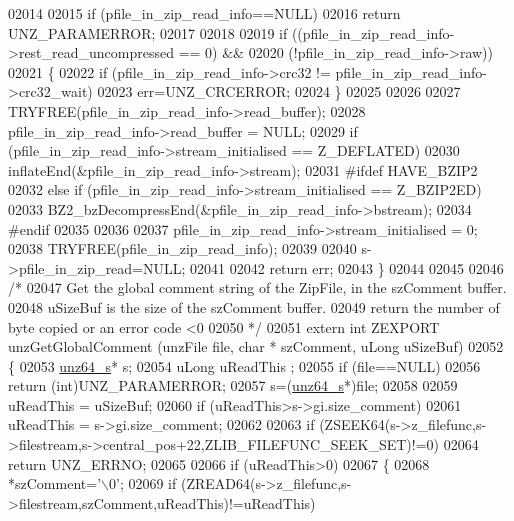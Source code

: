 \begin{DoxyCode}
02014 
02015     \textcolor{keywordflow}{if} (pfile\_in\_zip\_read\_info==NULL)
02016         \textcolor{keywordflow}{return} UNZ\_PARAMERROR;
02017 
02018 
02019     \textcolor{keywordflow}{if} ((pfile\_in\_zip\_read\_info->rest\_read\_uncompressed == 0) &&
02020         (!pfile\_in\_zip\_read\_info->raw))
02021     \{
02022         \textcolor{keywordflow}{if} (pfile\_in\_zip\_read\_info->crc32 != pfile\_in\_zip\_read\_info->crc32\_wait)
02023             err=UNZ\_CRCERROR;
02024     \}
02025 
02026 
02027     TRYFREE(pfile\_in\_zip\_read\_info->read\_buffer);
02028     pfile\_in\_zip\_read\_info->read\_buffer = NULL;
02029     \textcolor{keywordflow}{if} (pfile\_in\_zip\_read\_info->stream\_initialised == Z\_DEFLATED)
02030         inflateEnd(&pfile\_in\_zip\_read\_info->stream);
02031 \textcolor{preprocessor}{#ifdef HAVE\_BZIP2}
02032     \textcolor{keywordflow}{else} \textcolor{keywordflow}{if} (pfile\_in\_zip\_read\_info->stream\_initialised == Z\_BZIP2ED)
02033         BZ2\_bzDecompressEnd(&pfile\_in\_zip\_read\_info->bstream);
02034 \textcolor{preprocessor}{#endif}
02035 
02036 
02037     pfile\_in\_zip\_read\_info->stream\_initialised = 0;
02038     TRYFREE(pfile\_in\_zip\_read\_info);
02039 
02040     s->pfile\_in\_zip\_read=NULL;
02041 
02042     \textcolor{keywordflow}{return} err;
02043 \}
02044 
02045 
02046 \textcolor{comment}{/*}
02047 \textcolor{comment}{  Get the global comment string of the ZipFile, in the szComment buffer.}
02048 \textcolor{comment}{  uSizeBuf is the size of the szComment buffer.}
02049 \textcolor{comment}{  return the number of byte copied or an error code <0}
02050 \textcolor{comment}{*/}
02051 \textcolor{keyword}{extern} \textcolor{keywordtype}{int} ZEXPORT unzGetGlobalComment (unzFile file, \textcolor{keywordtype}{char} * szComment, uLong uSizeBuf)
02052 \{
02053     \hyperlink{structunz64__s}{unz64\_s}* s;
02054     uLong uReadThis ;
02055     \textcolor{keywordflow}{if} (file==NULL)
02056         \textcolor{keywordflow}{return} (\textcolor{keywordtype}{int})UNZ\_PARAMERROR;
02057     s=(\hyperlink{structunz64__s}{unz64\_s}*)file;
02058 
02059     uReadThis = uSizeBuf;
02060     \textcolor{keywordflow}{if} (uReadThis>s->gi.size\_comment)
02061         uReadThis = s->gi.size\_comment;
02062 
02063     \textcolor{keywordflow}{if} (ZSEEK64(s->z\_filefunc,s->filestream,s->central\_pos+22,ZLIB\_FILEFUNC\_SEEK\_SET)!=0)
02064         \textcolor{keywordflow}{return} UNZ\_ERRNO;
02065 
02066     \textcolor{keywordflow}{if} (uReadThis>0)
02067     \{
02068       *szComment=\textcolor{charliteral}{'\(\backslash\)0'};
02069       \textcolor{keywordflow}{if} (ZREAD64(s->z\_filefunc,s->filestream,szComment,uReadThis)!=uReadThis)

\end{DoxyCode}
